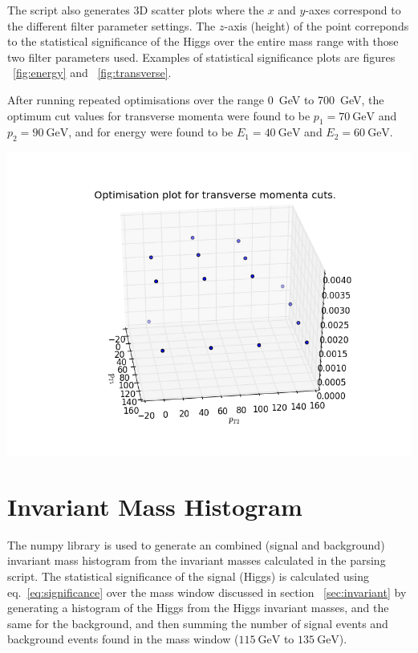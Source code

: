 \documentclass[11pt]{amsart}
\newenvironment{Figure}
  {\par\medskip\noindent\minipage{\linewidth}}
  {\endminipage\par\medskip}
\begin{document}
\begin{multicols}{2}
The script also generates 3D scatter plots where the $x$ and $y$-axes correspond to the different filter parameter settings. The $z$-axis (height) of the point correponds to the statistical significance of the Higgs over the entire mass range with those two filter parameters used. Examples of statistical significance plots are figures ~\ref{fig:energy} and ~\ref{fig:transverse}.

After running repeated optimisations over the range \SI{0}{\giga\electronvolt} to \SI{700}{\giga\electronvolt}, the optimum cut values for transverse momenta were found to be $p_1 = \SI{70}{\giga\electronvolt}$ and $p_2 = \SI{90}{\giga\electronvolt}$, and for energy were found to be $E_1 = \SI{40}{\giga\electronvolt}$ and $E_2 = \SI{60}{\giga\electronvolt}$.

\begin{Figure}
  \centering
  \includegraphics[width=\linewidth]{transverse}
  \label{fig:transverse}
\end{Figure}


\section{Invariant Mass Histogram}

The numpy library is used to generate an combined (signal and background) invariant mass histogram from the invariant masses calculated in the parsing script. The statistical significance of the signal (Higgs) is calculated using eq.~\ref{eq:significance} over the mass window discussed in section ~\ref{sec:invariant} by generating a histogram of the Higgs from the Higgs invariant masses, and the same for the background, and then summing the number of signal events and background events found in the mass window ($\SI{115}{\giga\electronvolt}$ to $\SI{135}{\giga\electronvolt}$).


\end{multicols}
\end{document}
